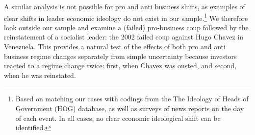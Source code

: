 \documentclass[12pt,final,fleqn]{article}
\theoremstyle{plain}
\begin{document}

A similar analysis is not possible for pro and anti business shifts, as examples of clear shifts in leader economic ideology do not exist in our sample.\footnote{Based on matching our cases with codings from the The Ideology of Heads of Government (HOG) database, as well as surveys of news reports on the day of each event. In all cases, no clear economic ideological shift can be identified.} We therefore look outside our sample and examine a (failed) pro-business coup followed by the reinstatement of a socialist leader: the 2002 failed coup against Hugo Chavez in Venezuela. This provides a natural test of the effects of both pro and anti business regime changes separately from simple uncertainty because investors reacted to a regime change twice: first, when Chavez was ousted, and second, when he was reinstated. 


\begin{figure}[!ht]
\end{figure}
\end{document}
